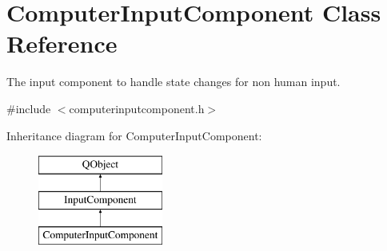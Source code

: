 \hypertarget{classComputerInputComponent}{\section{Computer\-Input\-Component Class Reference}
\label{classComputerInputComponent}
}


The input component to handle state changes for non human input.  




{\ttfamily \#include $<$computerinputcomponent.\-h$>$}

Inheritance diagram for Computer\-Input\-Component\-:\begin{figure}[H]
\begin{center}
\leavevmode
\includegraphics[height=3.000000cm]{classComputerInputComponent}
\end{center}
\end{figure}
